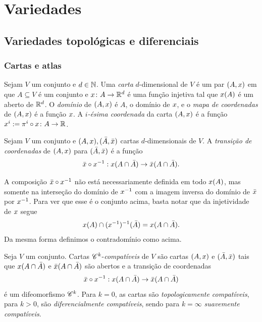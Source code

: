 \chapter{Variedades}

\section{Variedades topológicas e diferenciais}

\subsection{Cartas e atlas}

\begin{definition}
Sejam $V$ um conjunto e $d \in \mathbb{N}$. Uma \emph{carta} $d$-dimensional de $V$ é um par $(A,x)$ em que $A \subseteq V$ é um conjunto e $x\colon A \to \mathbb{R}^d$ é uma função injetiva tal que $x(A)$ é um aberto de $\mathbb{R}^d$. O \emph{domínio} de $(A,x)$ é $A$, o domínio de $x$, e o \emph{mapa de coordenadas} de $(A,x)$ é a função $x$. A \emph{$i$-ésima coordenada} da carta $(A,x)$ é a função $x^i := \pi^i \circ x\colon A \to \mathbb{R}$.
\end{definition}

\begin{definition}
Sejam $V$ um conjunto e $(A,x),(\bar A,\bar{x})$ cartas $d$-dimensionais de $V$. A \emph{transição de coordenadas} de $(A,x)$ para $(\bar A,\bar{x})$ é a função
	\begin{equation*}
	\bar{x} \circ x^{-1}: x(A \cap \bar A) \to \bar{x}(A \cap \bar A).
	\end{equation*}
\end{definition}

A composição $\bar{x} \circ x^{-1}$ não está necessariamente definida em todo $x(A)$, mas somente na interseção do domínio de $x^{-1}$ com a imagem inversa do domínio de $\bar{x}$ por $x^{-1}$. Para ver que esse é o conjunto acima, basta notar que da injetividade de $x$ segue
	\begin{equation*}
	x(A) \cap (x^{-1})^{-1}(\bar A) = x(A \cap \bar A).
	\end{equation*}
Da mesma forma definimos o contradomínio como acima.

\begin{definition}
Seja $V$ um conjunto. Cartas $\mathscr{C}^k$-\emph{compatíveis} de $V$ são cartas $(A,x)$ e $(\bar A,\bar{x})$ tais que $x(A \cap \bar A)$ e $\bar{x}(A \cap \bar A)$ são abertos e a transição de coordenadas
	\begin{equation*}
	\bar{x} \circ x^{-1}: x(A \cap \bar A) \to \bar{x}(A \cap \bar A)
	\end{equation*}
é um difeomorfismo $\mathscr{C}^k$. Para $k=0$, as cartas são \emph{topologicamente compatíveis}, para $k>0$, são \emph{diferencialmente compatíveis}, sendo para $k=\infty$ \emph{suavemente compatíveis}.
\end{definition}

